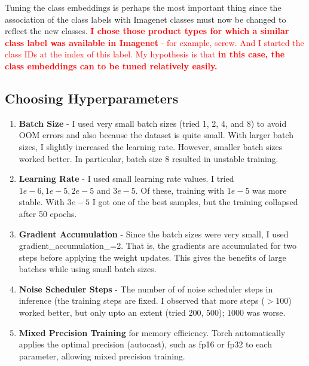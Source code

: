 \documentclass[]{article}
\begin{document}
Tuning the class embeddings is perhaps the most important thing since the association of the class labels with Imagenet classes must now be changed to reflect the new classes. \textcolor{red}{\textbf{I chose those product types for which a similar class label was available in Imagenet} - for example, screw. And I started the class IDs at the index of this label. My hypothesis is that \textbf{in this case, the class embeddings can to be tuned relatively easily.}}
\subsection{Choosing Hyperparameters}
\begin{enumerate}
	\item \textbf{Batch Size} - I used very small batch sizes (tried 1, 2, 4, and 8) to avoid OOM errors and also because the dataset is quite small. With larger batch sizes, I slightly increased the learning rate. However, smaller batch sizes worked better. In particular, batch size 8 resulted in unstable training. 
	\item \textbf{Learning Rate} - I used small learning rate values. I tried $1e-6, 1e-5, 2e-5$ and $3e-5$. Of these, training with $1e-5$ was more stable. With $3e-5$ I got one of the best samples, but the training collapsed after 50 epochs. 
	\item \textbf{Gradient Accumulation} - Since the batch sizes were very small, I used  gradient\_accumulation\_=2. That is, the gradients are accumulated for two steps before applying the weight updates. This gives the benefits of large batches while using small batch sizes. 
	\item \textbf{Noise Scheduler Steps} - The number of of noise scheduler steps in inference (the training steps are fixed. I observed that more steps ($>100$) worked better, but only upto an extent (tried 200, 500); $1000$ was worse. 
	\item \textbf{Mixed Precision Training} for memory efficiency. Torch automatically applies the optimal precision (autocast), such as fp16 or fp32 to each parameter, allowing mixed precision training. 	
\end{enumerate}
\end{document}
